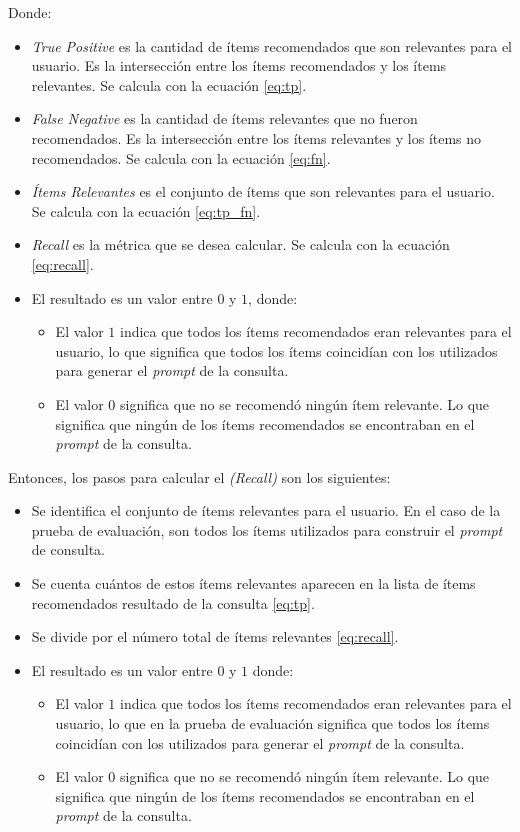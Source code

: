 \documentclass[11pt,a4paper,twoside]{thesis}
\begin{document}
Donde:
\begin{itemize}
	\item \textit{True Positive} es la cantidad de ítems recomendados que son relevantes para el usuario. Es la intersección entre los ítems recomendados y los ítems relevantes. Se calcula con la ecuación \ref{eq:tp}.
	\item \textit{False Negative} es la cantidad de ítems relevantes que no fueron recomendados. Es la intersección entre los ítems relevantes y los ítems no recomendados. Se calcula con la ecuación \ref{eq:fn}.
	\item \textit{Ítems Relevantes} es el conjunto de ítems que son relevantes para el usuario. Se calcula con la ecuación \ref{eq:tp_fn}.
	\item \textit{Recall} es la métrica que se desea calcular. Se calcula con la ecuación \ref{eq:recall}.
	\item El resultado es un valor entre $0$ y $1$, donde:
	      \begin{itemize}
		      \item El valor $1$ indica que todos los ítems recomendados eran relevantes para el usuario, lo que significa que todos los ítems coincidían con los utilizados para generar el \textit{prompt} de la consulta.
		      \item El valor $0$ significa que no se recomendó ningún ítem relevante. Lo que significa que ningún de los ítems recomendados se encontraban en el \textit{prompt} de la consulta.
	      \end{itemize}
\end{itemize}


Entonces, los pasos para calcular el \textit{(Recall)} son los siguientes:

\begin{itemize}
	\item Se identifica el conjunto de ítems relevantes para el usuario. En el caso de la prueba de evaluación, son todos los ítems utilizados para construir el \textit{prompt} de consulta.
	\item Se cuenta cuántos de estos ítems relevantes aparecen en la lista de ítems recomendados resultado de la consulta \ref{eq:tp}.
	\item Se divide por el número total de ítems relevantes \ref{eq:recall}.
	\item El resultado es un valor entre $0$ y $1$ donde:
	      \begin{itemize}
		      \item El valor $1$ indica que todos los ítems recomendados eran relevantes para el usuario, lo que en la prueba de evaluación significa que todos los ítems coincidían con los utilizados para generar el \textit{prompt} de la consulta.
		      \item El valor $0$ significa que no se recomendó ningún ítem relevante. Lo que significa que ningún de los ítems recomendados se encontraban en el \textit{prompt} de la consulta.
	      \end{itemize}
\end{itemize}
\end{document}
